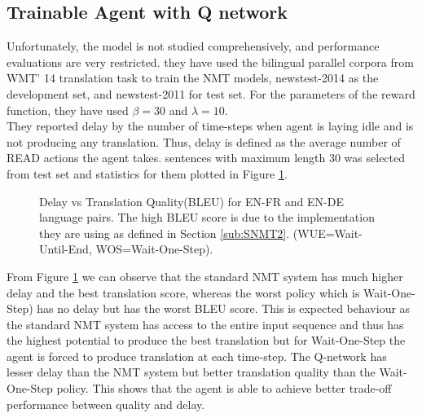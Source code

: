 \documentclass{sfuthesis}
\begin{document}
\subsection{Trainable Agent with Q network}
Unfortunately, the model is not studied comprehensively, and performance evaluations are very restricted. they have used the bilingual parallel corpora from WMT' 14 translation task to train the NMT models, newstest-2014 as the development set, and newstest-2011 for test set. For the parameters of the reward function, they have used $\beta = 30$ and $\lambda = 10$.\\
They reported delay by the number of time-steps when agent is laying idle and is not producing any translation. Thus, delay is defined as the average number of READ actions the agent takes. sentences with maximum length 30 was selected from test set and statistics for them  plotted in Figure \ref{fig:qnetwork0}.\\

\begin{figure}[h]
\centering
{}
\vspace{0.7cm}
    \caption[Quality vs Delay for Q-network agent.]
{ Delay vs Translation Quality(BLEU) for EN-FR and EN-DE language pairs. The high BLEU score is due to the implementation they are using as defined in Section \ref{sub:SNMT2}. (WUE=Wait-Until-End, WOS=Wait-One-Step).}
\label{fig:qnetwork0}

\end{figure}

From Figure \ref{fig:qnetwork0} we can observe that the standard NMT system has much higher delay and the best translation score, whereas the worst policy which is Wait-One-Step) has no delay but has the worst BLEU score. This is expected behaviour as the standard NMT system has access to the entire input sequence and thus has the highest potential to produce the best translation but for Wait-One-Step the agent is forced to produce translation at each time-step. The Q-network has lesser delay than the NMT system but better translation quality than the Wait-One-Step policy. This shows that the agent is able to achieve better trade-off performance between quality and delay.
\end{document}
